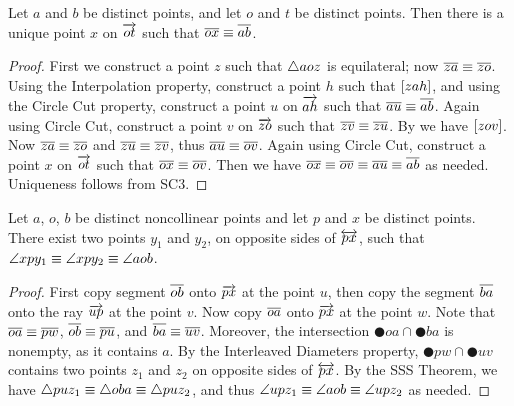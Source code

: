 \begin{construct}
Let \(a\) and \(b\) be distinct points, and let \(o\) and \(t\) be distinct points.
Then there is a unique point \(x\) on \(\overrightarrow{ot}\) such that \(\overline{ox} \equiv \overline{ab}\).
\end{construct}

\begin{proof}
First we construct a point \(z\) such that \(\bigtriangleup{aoz}\) is equilateral; now \(\overline{za} \equiv \overline{zo}\).
Using the Interpolation property, construct a point \(h\) such that \([ z a h ]\), and using the Circle Cut property, construct a point \(u\) on \(\overrightarrow{ah}\) such that \(\overline{au} \equiv \overline{ab}\).
Again using Circle Cut, construct a point \(v\) on \(\overrightarrow{zo}\) such that \(\overline{zv} \equiv \overline{zu}\).
By  we have \([ z o v ]\).
Now \(\overline{za} \equiv \overline{zo}\) and \(\overline{zu} \equiv \overline{zv}\), thus \(\overline{au} \equiv \overline{ov}\).
Again using Circle Cut, construct a point \(x\) on \(\overrightarrow{ot}\) such that \(\overline{ox} \equiv \overline{ov}\).
Then we have \(\overline{ox} \equiv \overline{ov} \equiv \overline{au} \equiv \overline{ab}\) as needed.
Uniqueness follows from SC3.
\end{proof}

\begin{construct}
Let \(a\), \(o\), \(b\) be distinct noncollinear points and let \(p\) and \(x\) be distinct points.
There exist two points \(y_1\) and \(y_2\), on opposite sides of \(\overleftrightarrow{px}\), such that \(\angle{xpy_1} \equiv \angle{xpy_2} \equiv \angle{aob}\). 
\end{construct}

\begin{proof}
First copy segment \(\overline{ob}\) onto \(\overrightarrow{px}\) at the point \(u\), then copy the segment \(\overline{ba}\) onto the ray \(\overrightarrow{up}\) at the point \(v\).
Now copy \(\overline{oa}\) onto \(\overrightarrow{px}\) at the point \(w\).
Note that \(\overline{oa} \equiv \overline{pw}\), \(\overline{ob} \equiv \overline{pu}\), and \(\overline{ba} \equiv \overline{uv}\).
Moreover, the intersection \(\CIRCLE{o}{a} \cap \CIRCLE{b}{a}\) is nonempty, as it contains \(a\).
By the Interleaved Diameters property, \(\CIRCLE{p}{w} \cap \CIRCLE{u}{v}\) contains two points \(z_1\) and \(z_2\) on opposite sides of \(\overleftrightarrow{px}\).
By the SSS Theorem, we have \(\bigtriangleup{puz_1} \equiv \bigtriangleup{oba} \equiv \bigtriangleup{puz_2}\), and thus \(\angle{upz_1} \equiv \angle{aob} \equiv \angle{upz_2}\) as needed.
\end{proof}

